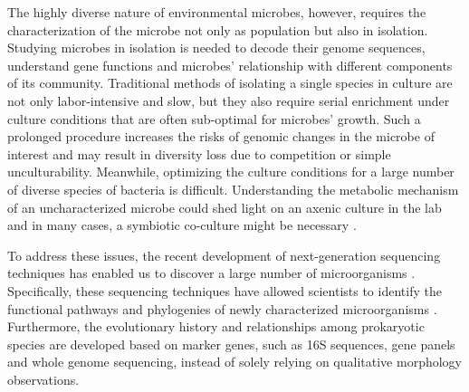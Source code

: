 
The highly diverse nature of environmental microbes, however, requires the characterization of the microbe not only as population but also in isolation. Studying microbes in isolation is needed to decode their genome sequences, understand gene functions and microbes' relationship with different components of its community. Traditional methods of isolating a single species in culture are not only labor-intensive and slow, but they also require serial enrichment under culture conditions that are often sub-optimal for microbes' growth\cite{Blainey:2013dp}. Such a prolonged procedure increases the risks of genomic changes in the microbe of interest and may result in diversity loss due to competition or simple unculturability. Meanwhile, optimizing the culture conditions for a large number of diverse species of bacteria is difficult. 
Understanding the metabolic mechanism of an uncharacterized microbe could shed light on an axenic culture in the lab and in many cases, a symbiotic co-culture might be necessary \cite{HuiWang:2014gj}. 

To address these issues, the recent development of next-generation sequencing techniques has enabled us to discover a large number of microorganisms \cite{Rinke:2014fu,Stepanauskas:2007ir,Blainey:2011dk}. Specifically, these sequencing techniques have allowed scientists to identify the functional pathways and phylogenies of newly characterized microorganisms \cite{Rinke:2013bt}. Furthermore, the evolutionary history and relationships among prokaryotic species are developed based on marker genes, such as 16S sequences, gene panels and whole genome sequencing, instead of solely relying on qualitative morphology observations. 

